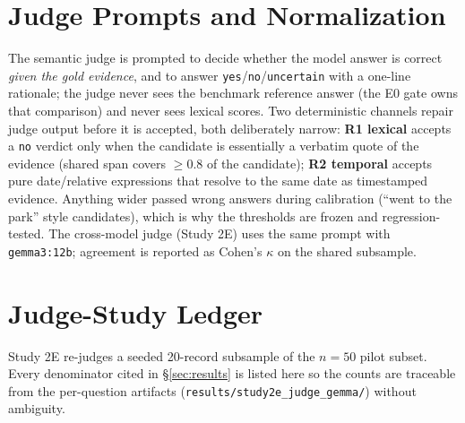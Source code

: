 \documentclass[11pt]{article}
\begin{document}
\section{Judge Prompts and Normalization}
\label{app:judge}

The semantic judge is prompted to decide whether the model answer is
correct \emph{given the gold evidence}, and to answer
\texttt{yes}/\texttt{no}/\texttt{uncertain} with a one-line rationale;
the judge never sees the benchmark reference answer (the E0 gate owns that
comparison) and never sees lexical scores. Two deterministic channels
repair judge output before it is accepted, both deliberately narrow:
\textbf{R1 lexical} accepts a \texttt{no} verdict only when the candidate
is essentially a verbatim quote of the evidence (shared span covers
$\geq 0.8$ of the candidate); \textbf{R2 temporal} accepts pure
date/relative expressions that resolve to the same date as timestamped
evidence. Anything wider passed wrong answers during calibration
(``went to the park'' style candidates), which is why the thresholds are
frozen and regression-tested. The cross-model judge (Study 2E) uses the
same prompt with \texttt{gemma3:12b}; agreement is reported as Cohen's
$\kappa$ on the shared subsample.

\section{Judge-Study Ledger}
\label{app:judge-ledger}

Study 2E re-judges a seeded 20-record subsample of the $n{=}50$ pilot
subset. Every
denominator cited in \S\ref{sec:results} is listed here so the counts
are traceable from the per-question artifacts
(\texttt{results/study2e\_judge\_gemma/}) without ambiguity.
\end{document}
